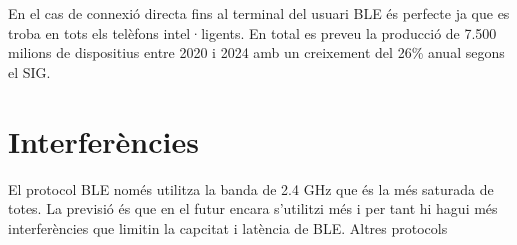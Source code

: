En el cas de connexió directa fins al terminal del usuari BLE és perfecte ja que es troba en tots els telèfons intel·ligents.
En total es preveu la producció de 7.500 milions de dispositius entre 2020 i 2024 amb un creixement del 26\% anual segons el SIG\cite{Bluetooth_Market_Update_2020}.


\section{Interferències}

El protocol BLE només utilitza la banda de 2.4 GHz que és la més saturada de totes.
La previsió és que en el futur encara s'utilitzi més i per tant hi hagui més interferències que limitin la capcitat i latència de BLE.
Altres protocols 